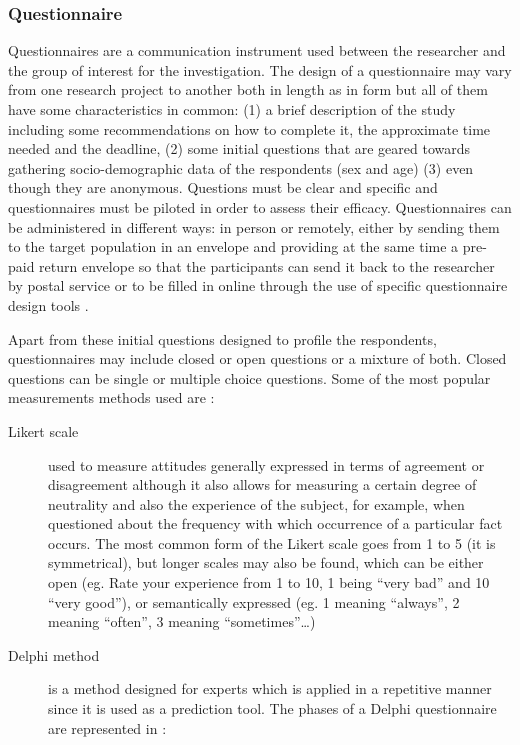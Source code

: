 \documentclass[output=paper]{LSP/langsci}
\begin{document}
\subsubsection{Questionnaire}

Questionnaires are a communication instrument used between the researcher and the group of interest for the investigation. The design of a questionnaire may vary from one research project to another both in length as in form but all of them have some characteristics in common: (1) a brief description of the study including some recommendations on how to complete it, the approximate time needed and the deadline, (2) some initial questions that are geared towards gathering socio-demographic data of the respondents (sex and age) (3) even though they are anonymous. Questions must be clear and specific and questionnaires must be piloted in order to assess their efficacy. Questionnaires can be administered in different ways: in person or remotely, either by sending them to the target population in an envelope and providing at the same time a pre-paid return envelope \citep{Ortega2011} so that the participants can send it back to the researcher by postal service or to be filled in online through the use of specific questionnaire design tools \citep{Bodzer2014}.

Apart from these initial questions designed to profile the respondents, questionnaires may include closed or open questions or a mixture of both. Closed questions can be single or multiple choice questions. Some of the most popular measurements methods used are \citep{Oppenheim2000, Gillham2008}: 

\begin{description}
\item[Likert scale] used to measure attitudes generally expressed in terms of agreement or disagreement although it also allows for measuring a certain degree of neutrality and also the experience of the subject, for example, when questioned about the frequency with which occurrence of a particular fact occurs. The most common form of the Likert scale goes from 1 to 5 (it is symmetrical), but longer scales may also be found, which can be either open (eg. Rate your experience from 1 to 10, 1 being ``very bad'' and 10 ``very good''), or semantically expressed (eg. 1 meaning ``always'', 2 meaning ``often'', 3 meaning ``sometimes''\ldots )
\item[Delphi method] is a method designed for experts which is applied in a repetitive manner since it is used as a prediction tool. The phases of a Delphi questionnaire are represented in :
\end{description}
\end{document}
